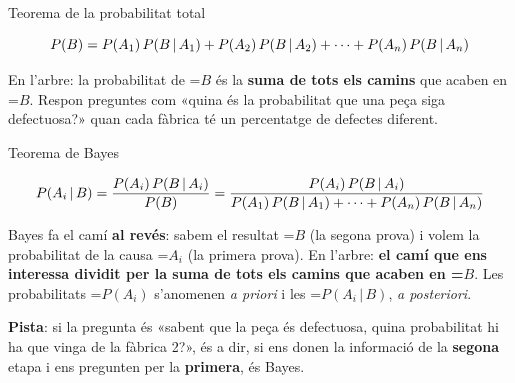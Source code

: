 \documentclass[11pt,a4paper]{article}
\newcommand{\fmm}[1]{\setbox0=\hbox{$#1$}\ifdim\wd0>\linewidth\fmdisp{#1}\else\mbox{\box0}\fi}
\newcommand{\fmdisp}[1]{\[\setbox2=\hbox{$\displaystyle #1$}\ifdim\wd2>\linewidth\resizebox{\linewidth}{!}{\box2}\else\box2\fi\]}
\newcommand{\fmuline}[1]{\textbf{\color{fmaccent}#1}}
\begin{document}
\begin{fmprop}{Teorema de la probabilitat total}

\fmdisp{P(B)=P(A_1)\,P(B\,|\,A_1)+P(A_2)\,P(B\,|\,A_2)+\dots+P(A_n)\,P(B\,|\,A_n)}

En l'arbre: la probabilitat de \fmm{B} és la \textbf{suma de tots els camins} que acaben en \fmm{B}. Respon preguntes com «quina és la probabilitat que una peça siga defectuosa?» quan cada fàbrica té un percentatge de defectes diferent.
\end{fmprop}

\begin{fmprop}{Teorema de Bayes}

\fmdisp{P(A_i\,|\,B)=\frac{P(A_i)\,P(B\,|\,A_i)}{P(B)}=\frac{P(A_i)\,P(B\,|\,A_i)}{P(A_1)\,P(B\,|\,A_1)+\dots+P(A_n)\,P(B\,|\,A_n)}}

Bayes fa el camí \textbf{al revés}: sabem el resultat \fmm{B} (la segona prova) i volem la probabilitat de la causa \fmm{A_i} (la primera prova). En l'arbre: \textbf{el camí que ens interessa dividit per la suma de tots els camins que acaben en \fmm{B}}. Les probabilitats \fmm{P(A_i)} s'anomenen \emph{a priori} i les \fmm{P(A_i\,|\,B)}, \emph{a posteriori}.

\begin{fmnote}\fmuline{Pista}: si la pregunta és «sabent que la peça és defectuosa, quina probabilitat hi ha que vinga de la fàbrica 2?», és a dir, si ens donen la informació de la \textbf{segona} etapa i ens pregunten per la \textbf{primera}, és Bayes.\end{fmnote}
\end{fmprop}
\end{document}
